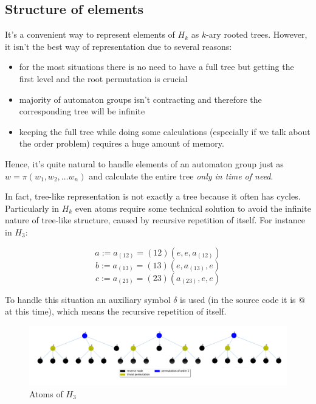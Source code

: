 \documentclass[a4paper,12pt]{amsart}
\begin{document}
\subsection{Structure of elements}

It's a convenient way to represent elements of $H_k$ as $k$-ary rooted trees. However, it isn't the best way of representation due to several reasons: 

\begin{itemize}
	\item for the most situations there is no need to have a full tree but getting the first level and the root permutation is crucial
	
	\item majority of automaton groups isn't contracting and therefore the corresponding tree will be infinite
	
	\item keeping the full tree while doing some calculations (especially if we talk about the order problem) requires a huge amount of memory.
\end{itemize}

Hence, it's quite natural to handle elements of an automaton group just as $w = \pi (w_1, w_2, \dots w_n)$ and calculate the entire tree \textit{only in time of need}. 

In fact, tree-like representation is not exactly a tree because it often has cycles. Particularly in $H_k$ even atoms require some technical solution to avoid the infinite nature of tree-like structure, caused by recursive repetition of itself. For instance in $H_3$: 

$$ a := a_{(12)} = (1 2) (e, e, a_{(12)}) $$
$$ b := a_{(13)} = (1 3) (e, a_{(13)}, e) $$
$$ c := a_{(23)} = (2 3) (a_{(23)}, e, e) $$


To handle this situation an auxiliary symbol $\delta$ is used (in the source code it is @ at this time), which means the recursive repetition of itself.

\begin{figure}[h]
	\includegraphics[scale=0.13]{a_b_c.png}
	\caption{Atoms of $H_3$}
\end{figure}
\end{document}
